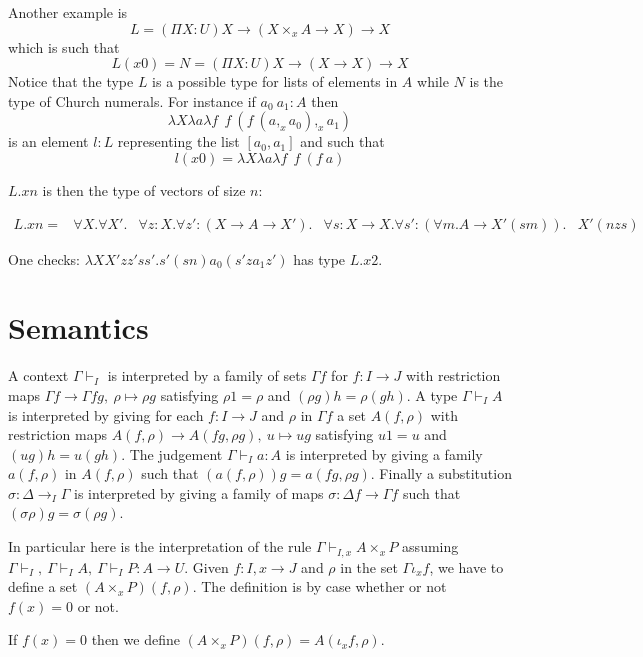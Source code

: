 \documentclass[10pt,a4paper]{article}
\begin{document}
\medskip

 Another example is
$$
L = (\Pi X:U)X\rightarrow (X\times_x A\rightarrow X)\rightarrow X
$$
which is such that
$$
L(x0) = N = (\Pi X:U)X\rightarrow (X\rightarrow X)\rightarrow X
$$
Notice that the type $L$ is a possible type for lists of elements in $A$ while
$N$ is the type of Church numerals. For instance if $a_0~a_1:A$ then
$$\lambda X\lambda a\lambda f~~f~(f~(a,_x a_0),_x a_1)$$
is an element $l:L$ representing the list $[a_0,a_1]$ and such that
$$l(x0) = \lambda X\lambda a\lambda f~~f~(f~a)$$


$L.x n$ is then the type of vectors of size $n$:

\begin{align*}
L.x n = & ∀X. ∀X'. 
        & ∀z:X. ∀z':(X → A → X').
        & ∀s:X→X. ∀s':(∀m. A → X'(s m)).
        & X'(n z s)
\end{align*}

One checks: $λX X' z z' s s'. s' (sn) a_0 (s' z a_1 z')$ has type $L.x 2$.

\section{Semantics}

 A context $\Gamma\vdash_I$ is interpreted
by a family of sets $\Gamma f$ for $f:I\rightarrow J$ with restriction maps
$\Gamma f\rightarrow \Gamma fg,~\rho\longmapsto \rho g$ satisfying $\rho 1 = \rho$
and $(\rho  g) h = \rho (gh)$. A type $\Gamma\vdash_I A$ is interpreted by giving
for each $f:I\rightarrow J$ and $\rho$ in $\Gamma f$ a set $A(f,\rho)$ with restriction
maps $A(f,\rho)\rightarrow A(fg,\rho g),~u\longmapsto u g$ satisfying $u1 = u$ and $(ug) h = u(gh)$.
The judgement $\Gamma\vdash _I a:A$ is interpreted by giving a family $a(f,\rho)$ in $A(f,\rho)$ such
that $(a(f,\rho))g = a(fg,\rho g)$. Finally a substitution $\sigma :\Delta\rightarrow_I \Gamma$
is interpreted by giving a family of maps $\sigma:\Delta f\rightarrow \Gamma f$ such that
$(\sigma\rho) g = \sigma (\rho g)$.

\medskip

 In particular here is the interpretation of the rule $\Gamma\vdash_{I,x} A\times_x P$
assuming $\Gamma\vdash_I,~\Gamma\vdash_I A,~\Gamma\vdash_I P:A\rightarrow U$.
Given $f:I,x\rightarrow J$ and $\rho$ in the set $\Gamma \iota_x f$, we have to define
a set $(A\times_x P)(f,\rho)$. The definition is by case whether or not $f(x) = 0$ or not.

 If $f(x) = 0$ then we define $(A\times_x P)(f,\rho) = A(\iota_x f,\rho)$.
\end{document}
